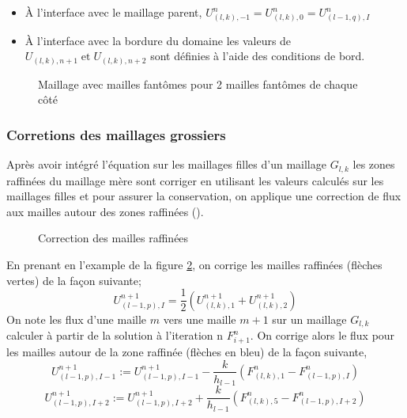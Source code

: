 \documentclass[12pt]{article}
\begin{document}
\begin{itemize}
    \item À l'interface avec le maillage parent, \( U_{(l, k), -1}^n = U_{(l, k), 0}^n = U_{(l-1, q), I}^n \) 
    \item À l'interface avec la bordure du domaine les valeurs de \( U_{(l, k), n+1} \; \text{et} \;  U_{(l, k), n+2}\) sont définies à l'aide des conditions de bord. 
\end{itemize}

\begin{figure}[htbp]
    \centering
    
    \caption{Maillage avec mailles fantômes pour 2 mailles fantômes de chaque côté}
    \label{ghost_cells}
\end{figure}

\subsubsection{Corretions des maillages grossiers}
Après avoir intégré l'équation sur les maillages filles d'un maillage \( G_{l, k}\) les zones raffinées du maillage mère sont corriger en utilisant les valeurs calculés sur les maillages filles et pour assurer la conservation, on applique une correction de flux aux mailles autour des zones raffinées (\cite{Berger_Leveque98}).

\begin{figure}[htbp]
    \centering
    
    \caption{Correction des mailles raffinées}
    \label{correction_overlapping}
\end{figure}

En prenant en l'example de la figure \ref{correction_overlapping}, on corrige les mailles raffinées (flèches vertes) de la façon suivante; 
\[ 
U_{(l-1, p), I}^{n+1} = \frac{1}{2}(U_{(l, k), 1}^{n+1} + U_{(l, k), 2}^{n+1} ) 
\] 
On note les flux d'une maille \(m\) vers une maille \(m+1\) sur un maillage \(G_{l, k}\) calculer à partir de la solution à l'iteration n \( F_{i+1}^n \).
On corrige alors le flux pour les mailles autour de la zone raffinée (flèches en bleu) de la façon suivante,
\[
U_{(l-1, p), I-1 }^{n+1} := U_{(l-1, p), I-1 }^{n+1} - \frac{k}{h_{l-1}} \left( F_{(l, k), 1}^n - F_{(l-1, p), I}^n \right)
\]
\[
U_{(l-1, p), I + 2}^{n+1} := U_{(l-1, p), I + 2}^{n+1} + \frac{k}{h_{l-1}} \left( F_{(l, k), 5}^n - F_{(l-1, p), I+2}^n \right)
\]
\end{document}
